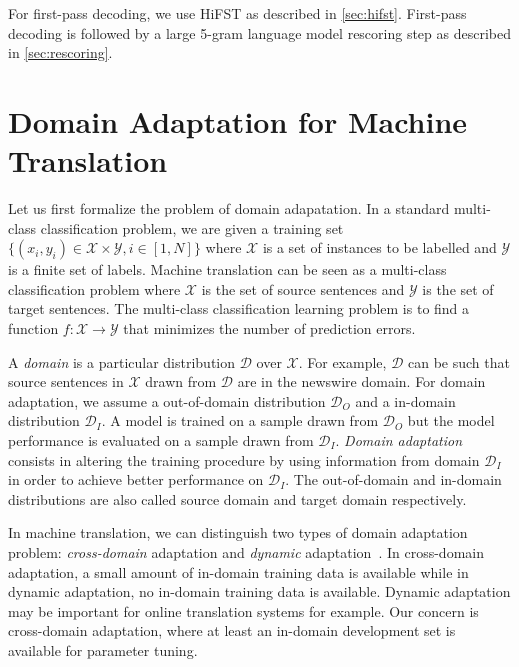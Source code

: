 For first-pass decoding, we use HiFST as described in \autoref{sec:hifst}. First-pass
decoding is followed by a large 5-gram language model rescoring step
as described in \autoref{sec:rescoring}.

\section{Domain Adaptation for Machine Translation}
\label{sec:domainAdaptationMT}

Let us first formalize the problem of domain adapatation.
In a standard multi-class classification problem, we are
given a training set
$\{(x_i, y_i) \in \mathcal{X} \times \mathcal{Y}, i \in [1, N]\}$
where $\mathcal{X}$ is a set of instances to be labelled and
$\mathcal{Y}$ is a finite set of labels. Machine translation
can be seen as a multi-class classification problem where $\mathcal{X}$
is the set of source sentences and $\mathcal{Y}$ is the set of
target sentences. The multi-class classification learning problem
is to find a function $f : \mathcal{X} \rightarrow \mathcal{Y}$
that minimizes the number of prediction errors.

A \emph{domain} is a particular distribution $\mathcal{D}$
over $\mathcal{X}$. For example, $\mathcal{D}$ can be such that
source sentences in $\mathcal{X}$ drawn from $\mathcal{D}$ are in the newswire
domain. For domain adaptation, we assume a out-of-domain distribution
$\mathcal{D}_O$ and a in-domain distribution $\mathcal{D}_I$.
A model is trained on
a sample drawn from $\mathcal{D}_O$ but the model performance
is evaluated on a sample drawn from $\mathcal{D}_I$.
\emph{Domain adaptation} consists in altering the training procedure
by using information from domain
$\mathcal{D}_I$ in order to achieve better performance on $\mathcal{D}_I$.
The out-of-domain and in-domain distributions are also called
source domain and target domain respectively.

In machine translation, we can distinguish two types of domain
adaptation problem: \emph{cross-domain} adaptation and \emph{dynamic}
adaptation~\citep{foster-kuhn:2007:WMT}. In cross-domain adaptation,
a small amount of in-domain training data is available while
in dynamic adaptation, no in-domain training data is available.
Dynamic adaptation may be important for online translation systems for example.
Our concern is cross-domain adaptation, where at least an in-domain
development set is available for parameter tuning.

